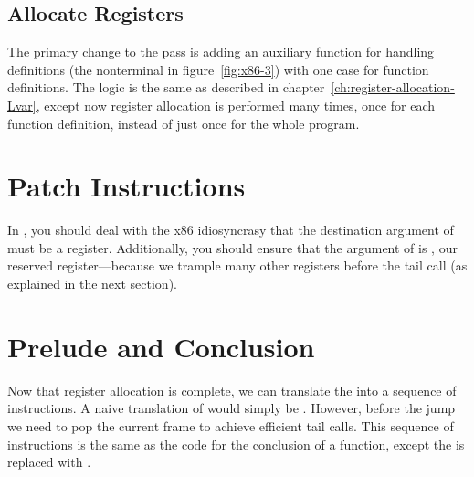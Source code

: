 \documentclass[7x10]{TimesAPriori_MIT}%
\numberwithin{theorem}{chapter}
\numberwithin{definition}{chapter}
\numberwithin{equation}{chapter}
\begin{document}
\subsection{Allocate Registers}

The primary change to the  pass is adding an
auxiliary function for handling definitions (the \Def{} nonterminal
in figure~\ref{fig:x86-3}) with one case for function definitions. The
logic is the same as described in
chapter~\ref{ch:register-allocation-Lvar}, except now register
allocation is performed many times, once for each function definition,
instead of just once for the whole program.


\section{Patch Instructions}

In , you should deal with the x86
idiosyncrasy that the destination argument of  must be a
register. Additionally, you should ensure that the argument of
 is , our reserved register---because we
trample many other registers before the tail call (as explained in the
next section).

\section{Prelude and Conclusion}

Now that register allocation is complete, we can translate the
 into a sequence of instructions. A naive translation of
 would simply be .  However,
before the jump we need to pop the current frame to achieve efficient
tail calls.  This sequence of instructions is the same as the code for
the conclusion of a function, except the  is replaced with
.
\end{document}
